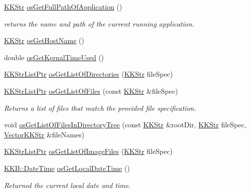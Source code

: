 \begin{DoxyCompactItemize}
\item 
\hyperlink{class_k_k_b_1_1_k_k_str}{K\+K\+Str} \hyperlink{namespace_k_k_b_a845d8ee501c4a296f40ccde682ff89d5}{os\+Get\+Full\+Path\+Of\+Application} ()
\begin{DoxyCompactList}\small\item\em returns the name and path of the current running application. \end{DoxyCompactList}\item 
\hyperlink{class_k_k_b_1_1_k_k_str}{K\+K\+Str} \hyperlink{namespace_k_k_b_a04b42daf497a75c9295b72d69fa22d55}{os\+Get\+Host\+Name} ()
\item 
double \hyperlink{namespace_k_k_b_a856461f539f67f0631160418c3c6d110}{os\+Get\+Kernal\+Time\+Used} ()
\item 
\hyperlink{namespace_k_k_b_a8f5f50672f37857425120831223888aa}{K\+K\+Str\+List\+Ptr} \hyperlink{namespace_k_k_b_a5a4fe85032282128eb06725d1f8e8b53}{os\+Get\+List\+Of\+Directories} (\hyperlink{class_k_k_b_1_1_k_k_str}{K\+K\+Str} file\+Spec)
\item 
\hyperlink{namespace_k_k_b_a8f5f50672f37857425120831223888aa}{K\+K\+Str\+List\+Ptr} \hyperlink{namespace_k_k_b_a47f37fe64afeebf0baffdf389148c3ba}{os\+Get\+List\+Of\+Files} (const \hyperlink{class_k_k_b_1_1_k_k_str}{K\+K\+Str} \&file\+Spec)
\begin{DoxyCompactList}\small\item\em Returns a list of files that match the provided file specification. \end{DoxyCompactList}\item 
void \hyperlink{namespace_k_k_b_a658ca60982f22259e03c60da4aebad8e}{os\+Get\+List\+Of\+Files\+In\+Directory\+Tree} (const \hyperlink{class_k_k_b_1_1_k_k_str}{K\+K\+Str} \&root\+Dir, \hyperlink{class_k_k_b_1_1_k_k_str}{K\+K\+Str} file\+Spec, \hyperlink{class_k_k_b_1_1_vector_k_k_str}{Vector\+K\+K\+Str} \&file\+Names)
\item 
\hyperlink{namespace_k_k_b_a8f5f50672f37857425120831223888aa}{K\+K\+Str\+List\+Ptr} \hyperlink{namespace_k_k_b_a1178e0d5f50045451695f205567a7c69}{os\+Get\+List\+Of\+Image\+Files} (\hyperlink{class_k_k_b_1_1_k_k_str}{K\+K\+Str} file\+Spec)
\item 
\hyperlink{class_k_k_b_1_1_date_time}{K\+K\+B\+::\+Date\+Time} \hyperlink{namespace_k_k_b_af54c205cde0465bcb2c74f3881a96413}{os\+Get\+Local\+Date\+Time} ()
\begin{DoxyCompactList}\small\item\em Returned the current local date and time. \end{DoxyCompactList}\item 

\end{DoxyCompactItemize}
